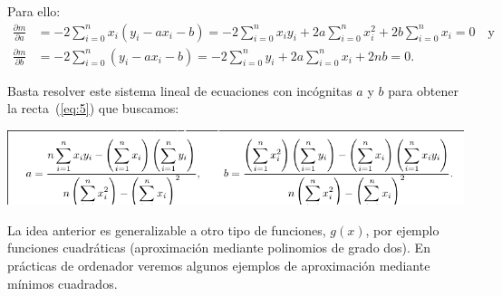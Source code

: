 Para ello:
\begin{align*}
  \frac{\partial m}{\partial a} & = 
  -2\sum_{i=0}^n
  x_i\left(
    y_i - a x_i - b
  \right) = 
  -2\sum_{i=0}^n x_i y_i
  +2a\sum_{i=0}^n x_i^2
  +2b\sum_{i=0}^n x_i
  = 0
  \quad \text{y} \\
  \frac{\partial m}{\partial b} & = 
  -2\sum_{i=0}^n
  \left(
    y_i - a x_i - b
  \right) = 
  -2\sum_{i=0}^n  y_i
  +2a\sum_{i=0}^n x_i
  +2nb
  = 0.
\end{align*}

Basta resolver este sistema lineal de ecuaciones con incógnitas $a$ y
$b$ para obtener la recta~(\ref{eq:5}) que buscamos:
\begin{center}
  \includegraphics[width=0.9\linewidth]{tema2/ecuacion-min-cuadr}
\end{center}

La idea anterior es generalizable a otro tipo de funciones, $g(x)$,
por ejemplo funciones cuadráticas (aproximación mediante polinomios de
grado dos).  En prácticas de ordenador veremos algunos ejemplos de
aproximación mediante mínimos cuadrados.

